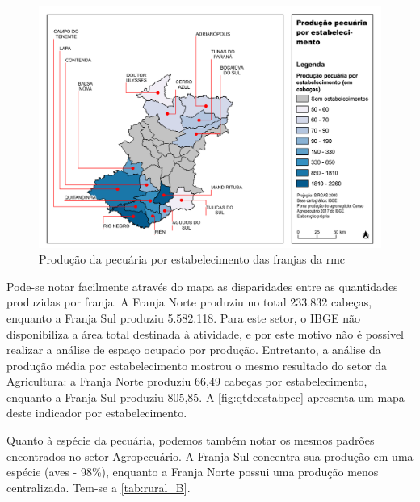 	\begin{landscape}
		\begin{figure}
			\centering
			\caption{Produção da pecuária por estabelecimento das franjas da \gls{rmc}}
			\label{fig:qtdeestabpec}
			\includegraphics[width=0.85\linewidth]{../gis/produtos/RMC_censorural_QTD_ESTAB_PEC}
		\end{figure}
	\end{landscape}

	Pode-se notar facilmente através do mapa as disparidades entre as quantidades produzidas por franja. A Franja Norte produziu no total 233.832 cabeças, enquanto a Franja Sul produziu 5.582.118. Para este setor, o IBGE não disponibiliza a área total destinada à atividade, e por este motivo não é possível realizar a análise de espaço ocupado por produção. Entretanto, a análise da produção média por estabelecimento mostrou o mesmo resultado do setor da Agricultura: a Franja Norte produziu 66,49 cabeças por estabelecimento, enquanto a Franja Sul produziu 805,85. A \autoref{fig:qtdeestabpec} apresenta um mapa deste indicador por estabelecimento.
	
	Quanto à espécie da pecuária, podemos também notar os mesmos padrões encontrados no setor Agropecuário. A Franja Sul concentra sua produção em uma espécie (aves - 98\%), enquanto a Franja Norte possui uma produção menos centralizada. Tem-se a \autoref{tab:rural_B}.

